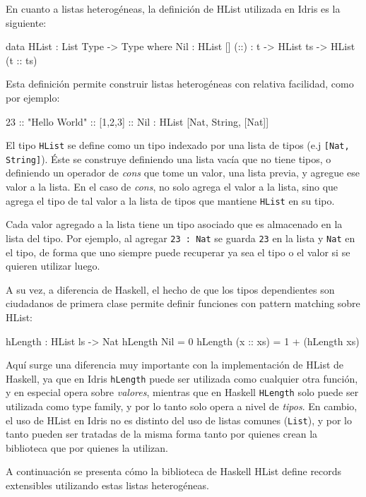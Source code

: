 En cuanto a listas heterogéneas, la definición de HList utilizada en Idris es la siguiente:

\begin{code}
data HList : List Type -> Type where
  Nil : HList []
  (::) : t -> HList ts -> HList (t :: ts)
\end{code}

Esta definición permite construir listas heterogéneas con relativa facilidad, como por ejemplo:

\begin{code}
23 :: "Hello World" :: [1,2,3] :: Nil :
  HList [Nat, String, [Nat]]
\end{code}

El tipo \texttt{HList} se define como un tipo indexado por una lista de tipos (e.j \texttt{[Nat, String]}). Éste se construye definiendo una lista vacía que no tiene tipos, o definiendo un operador de \textit{cons} que tome un valor, una lista previa, y agregue ese valor a la lista. En el caso de \textit{cons}, no solo agrega el valor a la lista, sino que agrega el tipo de tal valor a la lista de tipos que mantiene \texttt{HList} en su tipo.

Cada valor agregado a la lista tiene un tipo asociado que es almacenado en la lista del tipo. Por ejemplo, al agregar \texttt{23 : Nat} se guarda \texttt{23} en la lista y \texttt{Nat} en el tipo, de forma que uno siempre puede recuperar ya sea el tipo o el valor si se quieren utilizar luego.

A su vez, a diferencia de Haskell, el hecho de que los tipos dependientes son ciudadanos de primera clase permite definir funciones con pattern matching sobre HList:

\begin{code}
hLength : HList ls -> Nat
hLength Nil = 0
hLength (x :: xs) = 1 + (hLength xs)
\end{code}

Aquí surge una diferencia muy importante con la implementación de HList de Haskell, ya que en Idris \texttt{hLength} puede ser utilizada como cualquier otra función, y en especial opera sobre \textit{valores}, mientras que en Haskell \texttt{HLength} solo puede ser utilizada como type family, y por lo tanto solo opera a nivel de \textit{tipos}. En cambio, el uso de HList en Idris no es distinto del uso de listas comunes (\texttt{List}), y por lo tanto pueden ser tratadas de la misma forma tanto por quienes crean la biblioteca que por quienes la utilizan.

A continuación se presenta cómo la biblioteca de Haskell HList define records extensibles utilizando estas listas heterogéneas.

